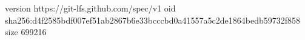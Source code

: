 version https://git-lfs.github.com/spec/v1
oid sha256:d4f2585bdf007ef51ab2867b6e33bcccbd0a41557a5c2de1864bedb59732f858
size 699216

